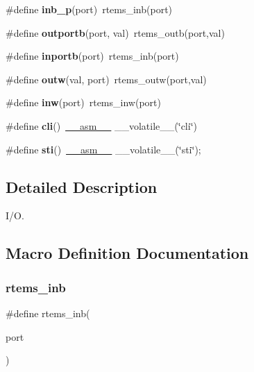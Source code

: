 \begin{DoxyCompactItemize}
\#define {\bfseries inb\+\_\+p}(port)~rtems\+\_\+inb(port)
\item 
\mbox{\label{group__i386__io_ga96d90dc5031ee76e6e611effb9d710d2}} 
\#define {\bfseries outportb}(port,  val)~rtems\+\_\+outb(port,val)
\item 
\mbox{\label{group__i386__io_gaea8c8be1950d6e91d8f4a000a33edd54}} 
\#define {\bfseries inportb}(port)~rtems\+\_\+inb(port)
\item 
\mbox{\label{group__i386__io_ga7aa7a647758c2b7606c5e5f12dfc6bc5}} 
\#define {\bfseries outw}(val,  port)~rtems\+\_\+outw(port,val)
\item 
\mbox{\label{group__i386__io_gac4195d1c9d8dcc8366ae15a79f06514c}} 
\#define {\bfseries inw}(port)~rtems\+\_\+inw(port)
\item 
\mbox{\label{group__i386__io_ga68c330e94fe121eba993e5a5973c3162}} 
\#define {\bfseries cli}()~\mbox{\hyperlink{group__RTEMSScoreCPUSPARC_ga82257d4fc068f4b21b029dd69d276839}{\+\_\+\+\_\+asm\+\_\+\+\_\+}} \+\_\+\+\_\+volatile\+\_\+\+\_\+(\char`\"{}cli\char`\"{})
\item 
\mbox{\label{group__i386__io_gac5d15f274bc9b1e96230f3d3c60fd1f8}} 
\#define {\bfseries sti}()~\mbox{\hyperlink{group__RTEMSScoreCPUSPARC_ga82257d4fc068f4b21b029dd69d276839}{\+\_\+\+\_\+asm\+\_\+\+\_\+}} \+\_\+\+\_\+volatile\+\_\+\+\_\+(\char`\"{}sti\char`\"{});
\end{DoxyCompactItemize}


\subsection{Detailed Description}
I/O. 



\subsection{Macro Definition Documentation}
\mbox{\label{group__i386__io_ga75867401856c866a7f4cf37795e77fc2}} 
\subsubsection{\texorpdfstring{rtems\_inb}{rtems\_inb}}
{\footnotesize\ttfamily \#define rtems\+\_\+inb(\begin{DoxyParamCaption}\item[{}]{port }\end{DoxyParamCaption})}

